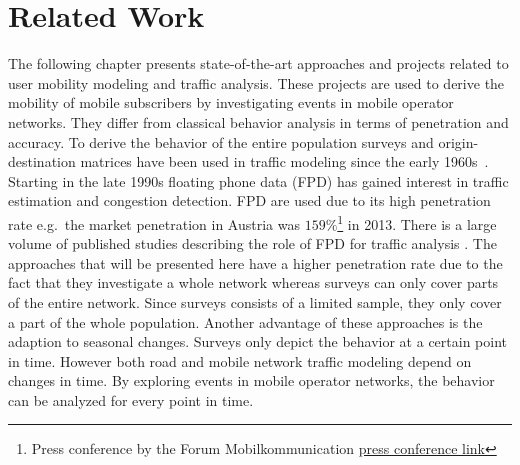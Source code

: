 \documentclass[master,english]{hgbthesis}
\begin{document}
\chapter{Related Work}
The following chapter presents state-of-the-art approaches and projects related to user mobility modeling and traffic analysis. These projects are used to derive the mobility of mobile subscribers by investigating events in mobile operator networks. They differ from classical behavior analysis in terms of penetration and accuracy. To derive the behavior of the entire population surveys and origin-destination matrices have been used in traffic modeling since the early 1960s~\cite{Beckmann,Heanue1966,Voorhees}.
Starting in the late 1990s floating phone data (FPD) has gained interest in traffic estimation and congestion detection. FPD are used due to its high penetration rate e.g.\, the market penetration in Austria was $159\%$\footnote{Press conference by the Forum Mobilkommunication \href{http://www.fmk.at/Medien/Pressekonferenzen/FMK-Jahrespressekonferenz-2012}{press conference link}} in 2013. There is a large volume of published studies describing the role of FPD for traffic analysis \cite{Yim2001,Qiu2007,Caceres2008}.
The approaches that will be presented here have a higher penetration rate due to the fact that they investigate a whole network whereas surveys can only cover parts of the entire network. Since surveys consists of a limited sample, they only cover a part of the whole population. Another advantage of these approaches is the adaption to seasonal changes. Surveys only depict the behavior at a certain point in time. However both road and mobile network traffic modeling depend on changes in time. By exploring events in mobile operator networks, the behavior can be analyzed for every point in time.
\end{document}
